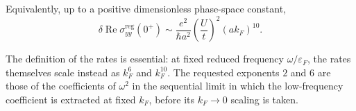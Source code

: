 {{Equivalently, up to a positive dimensionless phase-space constant,
\[
\delta\operatorname{Re}\sigma^{\mathrm{reg}}_{yy}(0^+)
 \sim \frac{e^2}{\hbar a^2}\left(\frac{U}{t}\right)^2(ak_F)^{10}.
\]

The definition of the rates is essential: at fixed reduced frequency $\omega/\varepsilon_F$, the rates themselves scale instead as $k_F^6$ and $k_F^{10}$. The requested exponents $2$ and $6$ are those of the coefficients of $\omega^2$ in the sequential limit in which the low-frequency coefficient is extracted at fixed \(k_F\), before its \(k_F\to0\) scaling is taken.
}
}
